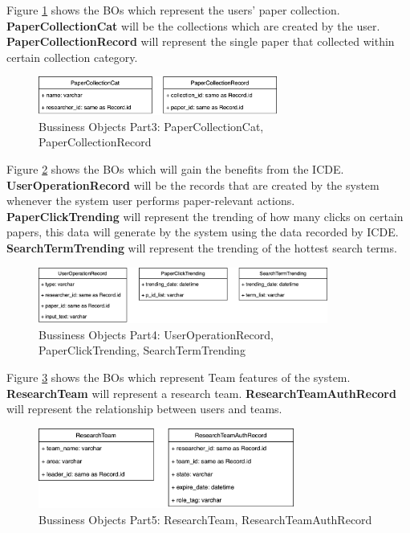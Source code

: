 Figure \ref{fig:bo_classes_3} shows the BOs which represent the users' paper collection. 
\textbf{PaperCollectionCat} will be the collections which are created by the user.
\textbf{PaperCollectionRecord} will represent the single paper that collected within certain collection category.

\begin{figure}[t]
	\centering
	\includegraphics[width=0.7\textwidth]{./img/bo_classes_3.png}
	\caption{Bussiness Objects Part3: PaperCollectionCat, PaperCollectionRecord}
	
	\label{fig:bo_classes_3}
\end{figure}

Figure \ref{fig:bo_classes_4} shows the BOs which will gain the benefits from the ICDE. 
\textbf{UserOperationRecord} will be the records that are created by the system whenever the system user performs paper-relevant actions.
\textbf{PaperClickTrending} will represent the trending of how many clicks on certain papers, 
this data will generate by the system using the data recorded by ICDE.
\textbf{SearchTermTrending} will represent the trending of the hottest search terms.

\begin{figure}[t]
	\centering
	\includegraphics[width=0.85\textwidth]{./img/bo_classes_4.png}
	\caption{Bussiness Objects Part4: UserOperationRecord,\\ PaperClickTrending, SearchTermTrending}
	
	\label{fig:bo_classes_4}
\end{figure}


Figure \ref{fig:bo_classes_5} shows the BOs which represent Team features of the system. 
\textbf{ResearchTeam} will represent a research team.
\textbf{ResearchTeamAuthRecord} will represent the relationship between users and teams.

\begin{figure}[t]
	\centering
	\includegraphics[width=0.75\textwidth]{./img/bo_classes_5.png}
	\caption{Bussiness Objects Part5: ResearchTeam, ResearchTeamAuthRecord}
	
	\label{fig:bo_classes_5}
\end{figure}

